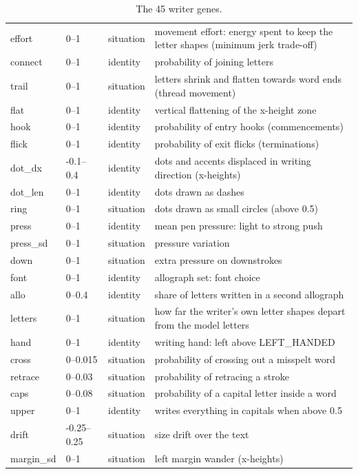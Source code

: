 \begin{table}[h]
\begin{tabular}{lllp{}}
effort & 0--1 & situation & movement effort: energy spent to keep the letter shapes (minimum jerk trade-off)\\
connect & 0--1 & identity & probability of joining letters\\
trail & 0--1 & situation & letters shrink and flatten towards word ends (thread movement)\\
flat & 0--1 & identity & vertical flattening of the x-height zone\\
hook & 0--1 & identity & probability of entry hooks (commencements)\\
flick & 0--1 & identity & probability of exit flicks (terminations)\\
dot\_dx & -0.1--0.4 & identity & dots and accents displaced in writing direction (x-heights)\\
dot\_len & 0--1 & identity & dots drawn as dashes\\
ring & 0--1 & situation & dots drawn as small circles (above 0.5)\\
press & 0--1 & identity & mean pen pressure: light to strong push\\
press\_sd & 0--1 & situation & pressure variation\\
down & 0--1 & situation & extra pressure on downstrokes\\
font & 0--1 & identity & allograph set: font choice\\
allo & 0--0.4 & identity & share of letters written in a second allograph\\
letters & 0--1 & situation & how far the writer's own letter shapes depart from the model letters\\
hand & 0--1 & identity & writing hand: left above LEFT\_HANDED\\
cross & 0--0.015 & situation & probability of crossing out a misspelt word\\
retrace & 0--0.03 & situation & probability of retracing a stroke\\
caps & 0--0.08 & situation & probability of a capital letter inside a word\\
upper & 0--1 & identity & writes everything in capitals when above 0.5\\
drift & -0.25--0.25 & situation & size drift over the text\\
margin\_sd & 0--1 & situation & left margin wander (x-heights)\\
\bottomrule\end{tabular}
\caption{The 45 writer genes.}
\label{tab:genes}\end{table}
